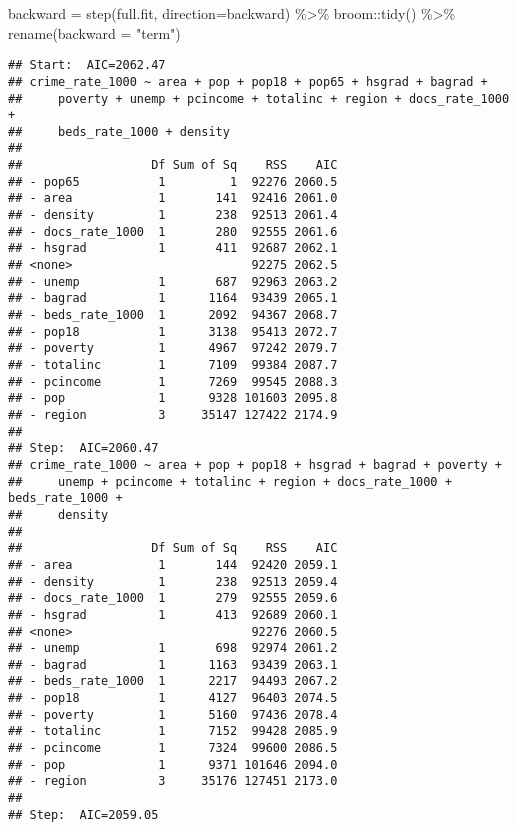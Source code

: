 \documentclass[
  11pt,
]{article}
\newenvironment{Shaded}{\begin{snugshade}}{\end{snugshade}}
\newcommand{\AttributeTok}[1]{\textcolor[rgb]{0.77,0.63,0.00}{#1}}
\newcommand{\FunctionTok}[1]{\textcolor[rgb]{0.00,0.00,0.00}{#1}}
\newcommand{\NormalTok}[1]{#1}
\newcommand{\OtherTok}[1]{\textcolor[rgb]{0.56,0.35,0.01}{#1}}
\newcommand{\SpecialCharTok}[1]{\textcolor[rgb]{0.00,0.00,0.00}{#1}}
\newcommand{\StringTok}[1]{\textcolor[rgb]{0.31,0.60,0.02}{#1}}
\begin{document}
\begin{Shaded}
\begin{Highlighting}[]
\NormalTok{backward }\OtherTok{=} \FunctionTok{step}\NormalTok{(full.fit, }\AttributeTok{direction=}\StringTok{\textquotesingle{}backward\textquotesingle{}}\NormalTok{) }\SpecialCharTok{\%\textgreater{}\%}\NormalTok{  broom}\SpecialCharTok{::}\FunctionTok{tidy}\NormalTok{() }\SpecialCharTok{\%\textgreater{}\%}  \FunctionTok{rename}\NormalTok{(}\AttributeTok{backward =} \StringTok{"term"}\NormalTok{)}
\end{Highlighting}
\end{Shaded}

\begin{verbatim}
## Start:  AIC=2062.47
## crime_rate_1000 ~ area + pop + pop18 + pop65 + hsgrad + bagrad + 
##     poverty + unemp + pcincome + totalinc + region + docs_rate_1000 + 
##     beds_rate_1000 + density
## 
##                  Df Sum of Sq    RSS    AIC
## - pop65           1         1  92276 2060.5
## - area            1       141  92416 2061.0
## - density         1       238  92513 2061.4
## - docs_rate_1000  1       280  92555 2061.6
## - hsgrad          1       411  92687 2062.1
## <none>                         92275 2062.5
## - unemp           1       687  92963 2063.2
## - bagrad          1      1164  93439 2065.1
## - beds_rate_1000  1      2092  94367 2068.7
## - pop18           1      3138  95413 2072.7
## - poverty         1      4967  97242 2079.7
## - totalinc        1      7109  99384 2087.7
## - pcincome        1      7269  99545 2088.3
## - pop             1      9328 101603 2095.8
## - region          3     35147 127422 2174.9
## 
## Step:  AIC=2060.47
## crime_rate_1000 ~ area + pop + pop18 + hsgrad + bagrad + poverty + 
##     unemp + pcincome + totalinc + region + docs_rate_1000 + beds_rate_1000 + 
##     density
## 
##                  Df Sum of Sq    RSS    AIC
## - area            1       144  92420 2059.1
## - density         1       238  92513 2059.4
## - docs_rate_1000  1       279  92555 2059.6
## - hsgrad          1       413  92689 2060.1
## <none>                         92276 2060.5
## - unemp           1       698  92974 2061.2
## - bagrad          1      1163  93439 2063.1
## - beds_rate_1000  1      2217  94493 2067.2
## - pop18           1      4127  96403 2074.5
## - poverty         1      5160  97436 2078.4
## - totalinc        1      7152  99428 2085.9
## - pcincome        1      7324  99600 2086.5
## - pop             1      9371 101646 2094.0
## - region          3     35176 127451 2173.0
## 
## Step:  AIC=2059.05

\end{verbatim}
\end{document}

